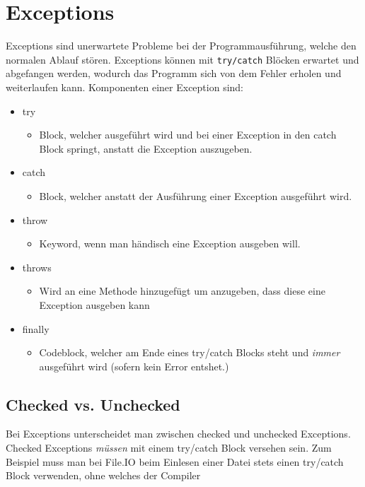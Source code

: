 \documentclass{article}
\begin{document}
	\section{Exceptions}
	Exceptions sind unerwartete Probleme bei der Programmausführung, welche den normalen Ablauf stören. Exceptions können mit \texttt{try/catch} Blöcken erwartet und abgefangen werden, wodurch das Programm sich von dem Fehler erholen und weiterlaufen kann. Komponenten einer Exception sind:
	\begin{itemize}
		\item{try}
		\begin{itemize}
			\item{Block, welcher ausgeführt wird und bei einer Exception in den catch Block springt, anstatt die Exception auszugeben.}
		\end{itemize}
		\item{catch}
		\begin{itemize}
			\item{Block, welcher anstatt der Ausführung einer Exception ausgeführt wird.}
		\end{itemize}
		\item{throw}
		\begin{itemize}
			\item{Keyword, wenn man händisch eine Exception ausgeben will.}
		\end{itemize}
		\item{throws}
		\begin{itemize}
			\item{Wird an eine Methode hinzugefügt um anzugeben, dass diese eine Exception ausgeben kann}
		\end{itemize}
		\item{finally}
		\begin{itemize}
			\item{Codeblock, welcher am Ende eines try/catch Blocks steht und \textit{immer} ausgeführt wird (sofern kein Error entshet.)}
		\end{itemize}
	\end{itemize}
	\subsection{Checked vs. Unchecked}
	Bei Exceptions unterscheidet man zwischen checked und unchecked Exceptions. \\
	Checked Exceptions \textit{müssen} mit einem try/catch Block versehen sein. Zum Beispiel muss man bei File.IO beim Einlesen einer Datei stets einen try/catch Block verwenden, ohne welches der Compiler
\end{document}

